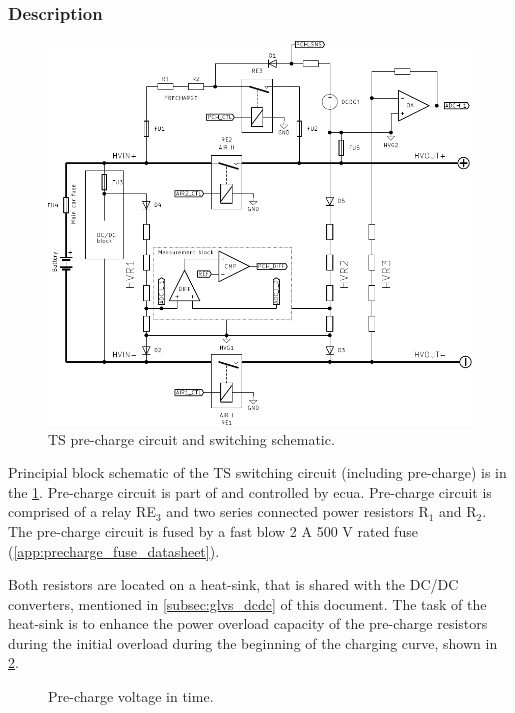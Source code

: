 \subsubsection{Description}\label{subsec:precharge}

\begin{figure}[H]
	\centering
	\includegraphics[width=\textwidth,clip]{./img/ECUA_AIRS.pdf}
	\caption{TS pre-charge circuit and switching schematic.}
	\label{fig:precharge_sch}
\end{figure}

Principial block schematic of the TS switching circuit (including pre-charge) is in the \ref{fig:precharge_sch}. Pre-charge circuit is part of and controlled by \gls{ecua}. Pre-charge circuit is comprised of a relay RE$_3$ and two series connected power resistors R$_1$ and R$_2$. The pre-charge circuit is fused by a fast blow 2 A 500 V rated fuse (\ref{app:precharge_fuse_datasheet}). 

Both resistors are located on a heat-sink, that is shared with the DC/DC converters, mentioned in \ref{subsec:glvs_dcdc} of this document. The task of the heat-sink is to enhance the power overload capacity of the pre-charge resistors during the initial overload during the beginning of the charging curve, shown in \ref{fig:precharge_voltage_time}.

\begin{figure}
		\caption{Pre-charge voltage in time.}
	\label{fig:precharge_voltage_time}
\end{figure}

